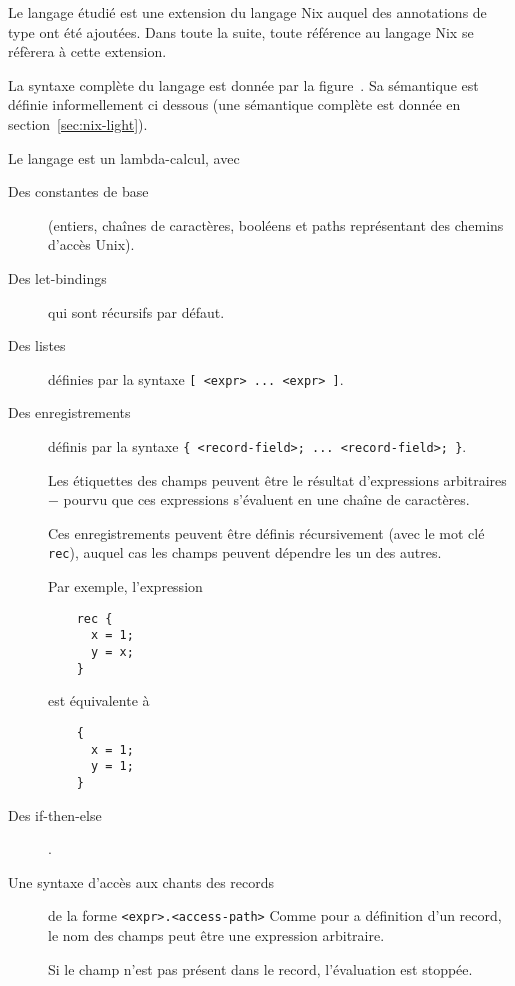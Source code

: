 Le langage étudié est une extension du langage Nix auquel des annotations de
type ont été ajoutées.
Dans toute la suite, toute référence au langage Nix se réfèrera à cette
extension.

La syntaxe complète du langage est donnée par la figure .
Sa sémantique est définie informellement ci dessous (une sémantique complète
est donnée en section \ref{sec:nix-light}).

Le langage est un lambda-calcul, avec

\begin{description}
  \item[Des constantes de base] (entiers, chaînes de caractères, booléens et
    paths représentant des chemins d'accès Unix).

  \item[Des let-bindings] qui sont récursifs par défaut.

  \item[Des listes] définies par la syntaxe \lstinline{[ <expr> ... <expr> ]}.

  \item[Des enregistrements] définis par la syntaxe
    \lstinline|{ <record-field>; ... <record-field>; }|. %

    Les étiquettes des champs peuvent être le résultat d'expressions
    arbitraires − pourvu que ces expressions s'évaluent en une chaîne de
    caractères.

    Ces enregistrements peuvent être définis récursivement (avec le mot clé
    \lstinline{rec}), auquel cas les champs peuvent dépendre les un des autres.

    Par exemple, l'expression

    \begin{lstlisting}
    rec {
      x = 1;
      y = x;
    }
    \end{lstlisting}
    est équivalente à
    \begin{lstlisting}
    {
      x = 1;
      y = 1;
    }
    \end{lstlisting}

  \item[Des if-then-else].

  \item[Une syntaxe d'accès aux chants des records] de la forme
    \lstinline{<expr>.<access-path>}
    Comme pour a définition d'un record, le nom des champs peut être une
    expression arbitraire.

    Si le champ n'est pas présent dans le record, l'évaluation est stoppée.


\end{description}

